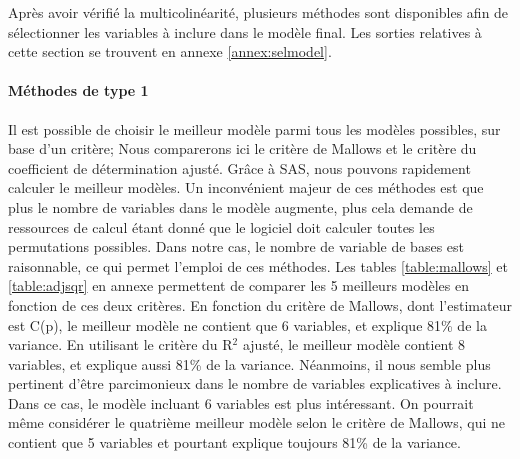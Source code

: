 \documentclass[11pt,a4paper]{article}
\begin{document}
Après avoir vérifié la multicolinéarité, plusieurs méthodes sont disponibles afin de sélectionner les variables à inclure dans le modèle final. Les sorties relatives à cette section se trouvent en annexe \ref{annex:selmodel}.

\paragraph{Méthodes de type 1} Il est possible de choisir le meilleur modèle parmi tous les modèles possibles, sur base d'un critère; Nous comparerons ici le critère de Mallows et le critère du coefficient de détermination ajusté. Grâce à SAS, nous pouvons rapidement calculer le meilleur modèles. Un inconvénient majeur de ces méthodes est que plus le nombre de variables dans le modèle augmente, plus cela demande de ressources de calcul étant donné que le logiciel doit calculer toutes les permutations possibles. Dans notre cas, le nombre de variable de bases est raisonnable, ce qui permet l'emploi de ces méthodes.
Les tables \ref{table:mallows} et \ref{table:adjsqr} en annexe permettent de comparer les 5 meilleurs modèles en fonction de ces deux critères. En fonction du critère de Mallows, dont l'estimateur est C(p), le meilleur modèle ne contient que 6 variables, et explique 81\% de la variance. En utilisant le critère du R$^2$ ajusté, le meilleur modèle contient 8 variables, et explique aussi 81\% de la variance. Néanmoins, il nous semble plus pertinent d'être parcimonieux dans le nombre de variables explicatives à inclure. Dans ce cas, le modèle incluant 6 variables est plus intéressant. On pourrait même considérer le quatrième meilleur modèle selon le critère de Mallows, qui ne contient que 5 variables et pourtant explique toujours 81\% de la variance.
\end{document}

